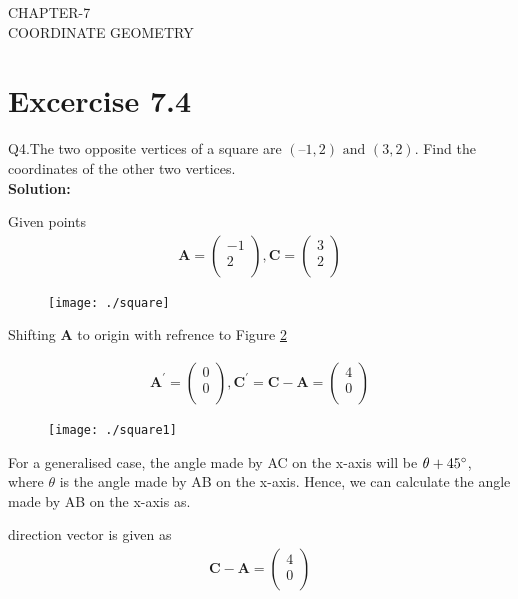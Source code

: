 \documentclass[12pt]{article}
\newcommand{\solution}{\noindent \textbf{Solution: }}
\newcommand{\myvec}[1]{\ensuremath{\begin{pmatrix}#1\end{pmatrix}}}
\let\vec\mathbf
\begin{document}
\begin{center}
\textbf\large{CHAPTER-7 \\ COORDINATE GEOMETRY}

\end{center}
\section*{Excercise 7.4}

Q4.The two opposite vertices of a square are $(–1, 2) \text{ and } (3, 2)$. Find the coordinates of the other two vertices.\\
\solution

Given points 
\begin{align}
\vec{A} = \myvec
{
-1 \\
 2\\
},
\vec{C} = 
\myvec
{
3\\
2\\
}
\end{align}

\begin{figure}[!h]
	\begin{center} 
	    \texttt{[image: ./square]}
	\end{center}
\caption{}
\label{fig:Fig1}
\end{figure}

Shifting $\vec{A}$ to origin with refrence to Figure \ref{fig:Fig2}

\begin{align}
\vec{A^{\prime}} =
\myvec{
0 \\
0\\
},
\vec{C^{\prime}} = \vec{C}-\vec{A} = 
\myvec{
4 \\
0\\
}
\end{align}

\begin{figure}[!h]
	\begin{center} 
	    \texttt{[image: ./square1]}
	\end{center}
\caption{}
\label{fig:Fig2}
\end{figure}

\newpage

For a generalised case, the angle made by AC on the x-axis will be $\theta + 45\degree$, where $\theta$ is the angle made by AB on the x-axis.
Hence, we can calculate the angle made by AB on the x-axis as.

direction vector is given as
\begin{align}
\vec{C} - \vec{A} = \myvec{
4\\
0\\
}
\end{align}
\end{document}
